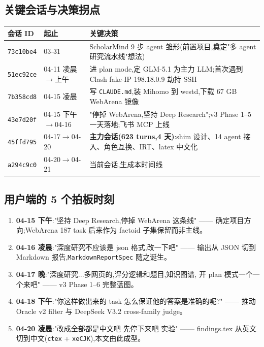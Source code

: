 \documentclass[UTF8,11pt]{ctexart}
\begin{document}
\subsection{关键会话与决策拐点}

\begin{center}
\small
\begin{tabular}{@{}p{1.6cm}p{2.3cm}p{8.5cm}@{}}
\toprule
\textbf{会话 ID} & \textbf{起止} & \textbf{关键决策} \\
\midrule
\texttt{73c10be4} & 03-31 & ScholarMind 9 步 agent 雏形(前置项目,奠定"多 agent 研究流水线"想法) \\
\texttt{51ec92ce} & 04-11 凌晨$\to$上午 & 进 plan mode,定 GLM-5.1 为主力 LLM;首次遇到 Clash fake-IP 198.18.0.9 劫持 SSH \\
\texttt{7b358cd8} & 04-15 凌晨 & 写 \texttt{CLAUDE.md},装 Mihomo 到 westd,下载 67 GB WebArena 镜像 \\
\texttt{43e7d20f} & 04-15 下午$\to$04-16 & "停掉 WebArena,坚持 Deep Research";v3 Phase 1--5 一天落地;飞书 MCP 上线 \\
\texttt{45ffd795} & 04-17$\to$04-20 & \textbf{主力会话(623 turns,4 天)}:shim 设计、14 agent 接入、角色互换、IRT、latex 中文化 \\
\texttt{a294c9c0} & 04-20$\to$04-21 & 当前会话,生成本时间线 \\
\bottomrule
\end{tabular}
\end{center}

\subsection{用户端的 5 个拍板时刻}

\begin{enumerate}[leftmargin=2em, labelsep=0.5em]
\item \textbf{04-15 下午}:"坚持 Deep Research,停掉 WebArena 这条线" ——
  确定项目方向;WebArena 187 task 后来作为 factoid 子集保留而非主线。
\item \textbf{04-16 凌晨}:"深度研究不应该是 json 格式,改一下吧" ——
  输出从 JSON 切到 Markdown 报告,\texttt{MarkdownReportSpec} 随之诞生。
\item \textbf{04-17 晚}:"深度研究...多网页的,评分逻辑和题目,知识图谱,
  开 plan 模式一个一个来吧" —— v3 Phase 1--6 完整蓝图。
\item \textbf{04-18 下午}:"你这样做出来的 task 怎么保证他的答案是准确的呢?"
  —— 推动 Oracle v2 filter 与 DeepSeek V3.2 cross-family judge。
\item \textbf{04-20 凌晨}:"改成全部都是中文吧 先停下来吧 实验" ——
  findings.tex 从英文切到中文(\texttt{ctex} + \texttt{xeCJK}),本文由此成型。
\end{enumerate}
\end{document}
